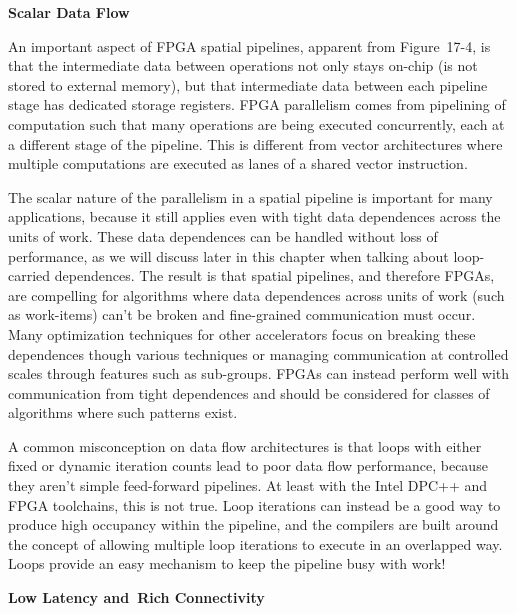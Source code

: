 \hspace*{\fill} \par %
\textbf{Scalar Data Flow}

An important aspect of FPGA spatial pipelines, apparent from Figure 17-4, is that the intermediate data between operations not only stays on-chip (is not stored to external memory), but that intermediate data between each pipeline stage has dedicated storage registers. FPGA parallelism comes from pipelining of computation such that many operations are being executed concurrently, each at a different stage of the pipeline. This is different from vector architectures where multiple computations are executed as lanes of a shared vector instruction.\par

The scalar nature of the parallelism in a spatial pipeline is important for many applications, because it still applies even with tight data dependences across the units of work. These data dependences can be handled without loss of performance, as we will discuss later in this chapter when talking about loop-carried dependences. The result is that spatial pipelines, and therefore FPGAs, are compelling for algorithms where data dependences across units of work (such as work-items) can’t be broken and fine-grained communication must occur. Many optimization techniques for other accelerators focus on breaking these dependences though various techniques or managing communication at controlled scales through features such as sub-groups. FPGAs can instead perform well with communication from tight dependences and should be considered for classes of algorithms where such patterns exist.\par

\begin{tcolorbox}[colback=blue!5!white,colframe=blue!75!black, title=LOOPS ARE FINE!]
A common misconception on data flow architectures is that loops with either fixed or dynamic iteration counts lead to poor data flow performance, because they aren’t simple feed-forward pipelines. At least with the Intel DPC++ and FPGA toolchains, this is not true. Loop iterations can instead be a good way to produce high occupancy within the pipeline, and the compilers are built around the concept of allowing multiple loop iterations to execute in an overlapped way. Loops provide an easy mechanism to keep the pipeline busy with work!
\end{tcolorbox}

\hspace*{\fill} \par %
\textbf{Low Latency and Rich Connectivity}

